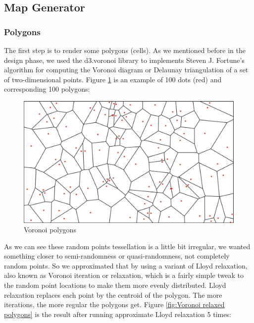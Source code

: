 \subsection{Map Generator}
\subsubsection{Polygons}
The first step is to render some polygons (cells). As we mentioned before in the design phase, we used the d3.voronoi library to implements Steven J. Fortune’s algorithm for computing the Voronoi diagram or Delaunay triangulation of a set of two-dimensional points. Figure \ref{fig:Voronoi polygons} is an example of 100 dots (red) and corresponding 100 polygons:

\begin{figure}[htbp]
\centering
\includegraphics[width=\textwidth]{section04/assets/Map-voronoi.png}
\caption[Voronoi polygons]{\label{fig:Voronoi polygons}Voronoi polygons}
\end{figure}

As we can see these random points tessellation is a little bit irregular, we wanted something closer to semi-randomness or quasi-randomness, not completely random points. So we approximated that by using a variant of Lloyd relaxation, also known as Voronoi iteration or relaxation, which is a fairly simple tweak to the random point locations to make them more evenly distributed. Lloyd relaxation replaces each point by the centroid of the polygon. The more iterations, the more regular the polygons get. Figure \ref{fig:Voronoi relaxed polygons} is the result after running approximate Lloyd relaxation 5 times:

